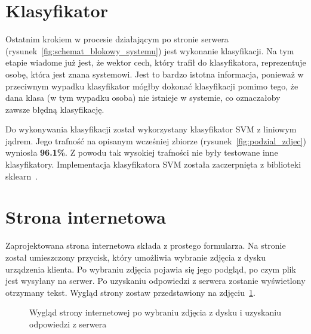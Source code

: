 \section{Klasyfikator}

Ostatnim krokiem w procesie działającym po stronie serwera (rysunek~\ref{fig:schemat_blokowy_systemu})
jest wykonanie klasyfikacji.
Na tym etapie wiadome już jest, że wektor cech, który trafił do klasyfikatora, reprezentuje osobę,
która jest znana systemowi.
Jest to bardzo istotna informacja, ponieważ w przeciwnym wypadku klasyfikator
mógłby dokonać klasyfikacji pomimo tego, że dana klasa (w tym wypadku osoba) nie istnieje w systemie,
co oznaczałoby zawsze błędną klasyfikację.

Do wykonywania klasyfikacji został wykorzystany klasyfikator SVM z liniowym jądrem.
Jego trafność na opisanym wcześniej zbiorze (rysunek~\ref{fig:podzial_zdjec}) wyniosła \textbf{96.1\%}.
Z powodu tak wysokiej trafności nie były testowane inne klasyfikatory.
Implementacja klasyfikatora SVM została zaczerpnięta z biblioteki sklearn~\cite{sklearn_api}.


\section{Strona internetowa}

Zaprojektowana strona internetowa składa z prostego formularza.
Na stronie został umieszczony przycisk, który umożliwia wybranie zdjęcia z dysku urządzenia klienta.
Po wybraniu zdjęcia pojawia się jego podgląd, po czym plik jest wysyłany na serwer.
Po uzyskaniu odpowiedzi z serwera zostanie wyświetlony otrzymany tekst.
Wygląd strony zostaw przedstawiony na zdjęciu~\ref{fig:ja}.

\begin{figure}[H]
    \centering
    \caption{Wygląd strony internetowej po wybraniu zdjęcia z dysku i uzyskaniu odpowiedzi z serwera}
    \customsource
    \label{fig:ja}
\end{figure}
